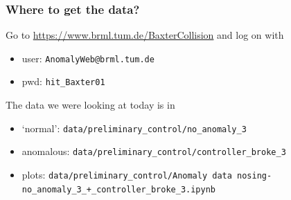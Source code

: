\documentclass[%
USenglish,%
pdftex,%
compress,%
10pt,%
svgnames%
,handout
]
{beamer}
\begin{document}
\begin{frame}
    \frametitle{Where to get the data?}
    Go to \url{https://www.brml.tum.de/BaxterCollision}
    and log on with
    \begin{itemize}
        \item user: \texttt{AnomalyWeb@brml.tum.de}
        \item pwd: \texttt{hit\_Baxter01}
    \end{itemize}
    \vspace{1cm}
    The data we were looking at today is in
    \begin{itemize}
        \item `normal': \texttt{data/preliminary\_control/no\_anomaly\_3}
        \item anomalous: \texttt{data/preliminary\_control/controller\_broke\_3}
        \item plots: \texttt{data/preliminary\_control/Anomaly data nosing-no\_anomaly\_3\_+\_controller\_broke\_3.ipynb} 
    \end{itemize}
    
\end{frame}
\end{document}
